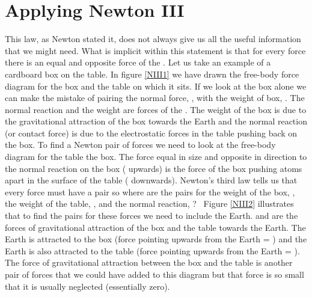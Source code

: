 \section{Applying Newton III}
This law, as Newton stated it, does not always give us all the useful information that we might need.  What is implicit within this statement is that for every force there is an equal and opposite force of the .  Let us take an example of a cardboard box on the table. \nl
In figure \ref{NIII1} we have drawn the free-body force diagram for the box and the table on which it sits.  If we look at the box alone we can make the mistake of pairing the normal force, ,  with the weight of box, .  The normal reaction and the weight are  forces of the . The weight of the box is due to the gravitational attraction of the box towards the Earth and the normal reaction (or contact force) is due to the electrostatic forces in the table pushing back on the box. To find a Newton pair of forces we need to look at the free-body diagram for the table  the box. The force equal in size and opposite in direction to the normal reaction on the box ( upwards) is the force of the box pushing atoms apart in the surface of the table ( downwards).\nl
Newton's third law tells us that every force must have a pair so where are the pairs for the weight of the box, , the weight of the table, , and the normal reaction, ? \  Figure \ref{NIII2} illustrates that to find the pairs for these forces we need to include the Earth.    and  are the forces of gravitational attraction of the box and the table towards the Earth.  The Earth is attracted to the box (force pointing upwards from the Earth = ) and the Earth is also attracted to the table (force pointing upwards from the Earth = ).\nl
The force of gravitational attraction between the box and the table is another pair of forces that we could have added to this diagram but that force is so small that it is usually neglected (essentially zero).

